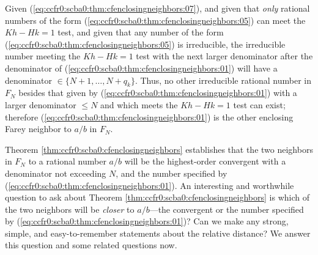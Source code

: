 \begin{vworktheoremproof}
Given (\ref{eq:ccfr0:scba0:thm:cfenclosingneighbors:07}), 
and given that \emph{only} rational numbers of the form
(\ref{eq:ccfr0:scba0:thm:cfenclosingneighbors:05}) 
can meet the $Kh-Hk=1$ test, and given that any number of the
form (\ref{eq:ccfr0:scba0:thm:cfenclosingneighbors:05}) 
is irreducible, the irreducible number meeting the
$Kh-Hk=1$ test with the next larger denominator after the denominator of
 (\ref{eq:ccfr0:scba0:thm:cfenclosingneighbors:01})
will have a denominator $\in \{ N+1, \ldots, N+q_k \}$.  Thus,
no other irreducible rational number in $F_N$ besides that given
by (\ref{eq:ccfr0:scba0:thm:cfenclosingneighbors:01}) with a larger denominator
$\leq N$ and which meets the $Kh - Hk = 1$ test can exist; therefore
(\ref{eq:ccfr0:scba0:thm:cfenclosingneighbors:01}) is the other enclosing Farey neighbor to
$a/b$ in $F_N$.
\end{vworktheoremproof}
\vworktheoremfooter{}

Theorem \ref{thm:ccfr0:scba0:cfenclosingneighbors} establishes that
the two neighbors in $F_N$ to a rational number $a/b$ will be the highest-order
convergent with a denominator not exceeding $N$, and the number 
specified by (\ref{eq:ccfr0:scba0:thm:cfenclosingneighbors:01}).
An interesting and worthwhile question to ask about 
Theorem \ref{thm:ccfr0:scba0:cfenclosingneighbors} is which of the
two neighbors will be \emph{closer} to $a/b$---the convergent or the
number specified by (\ref{eq:ccfr0:scba0:thm:cfenclosingneighbors:01})?
Can we make any strong, simple, and easy-to-remember statements 
about the relative distance?  We answer this question and some related 
questions now.

